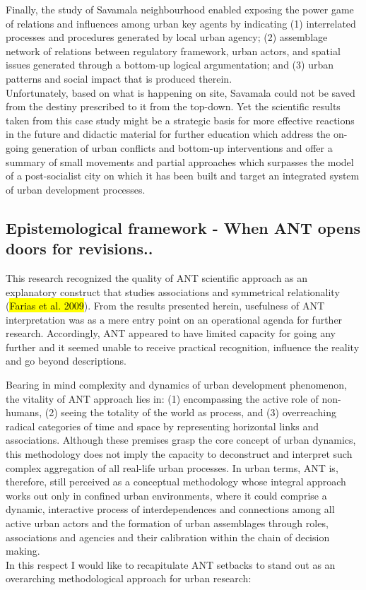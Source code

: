 \documentclass[11pt]{report}
\begin{document}
Finally, the study of Savamala neighbourhood enabled exposing the power game of relations and influences among urban key agents by indicating
(1)	interrelated processes and procedures generated by local urban agency;
(2)	assemblage network of relations between regulatory framework, urban actors,  and spatial issues generated through a bottom-up logical argumentation;
and
(3)	urban  patterns  and  social  impact that is produced therein.  
\\
Unfortunately, based on what is happening on site, Savamala could not be saved from the destiny prescribed to it from the top-down.
Yet the scientific results taken from this case study might be a strategic basis for more effective reactions in the future and didactic material for further education which address the on-going generation of urban conflicts and bottom-up interventions and offer a summary of small movements and partial approaches which surpasses the model of a post-socialist city on which it has been built and target an integrated system of urban development processes.
 
\subsection{Epistemological framework - When ANT opens doors for revisions..}
 
This research recognized the quality of ANT scientific approach as an explanatory construct that studies associations and symmetrical relationality (\hl{Farias et al. 2009}).
From the results presented herein, usefulness of ANT interpretation was as a mere entry point on an operational agenda for further research.
Accordingly, ANT appeared to have limited capacity for going any further and it seemed unable to receive practical recognition, influence the reality and go beyond descriptions.

Bearing in mind complexity and dynamics of urban development phenomenon, the vitality of ANT approach lies in: (1) encompassing the active role of non-humans, (2) seeing the totality of the world as process, and (3) overreaching radical categories of time and space by representing horizontal links and associations.
Although these premises grasp the core concept of urban dynamics, this methodology does not imply the capacity to deconstruct and interpret such complex aggregation of all real-life urban processes.
In urban terms, ANT is, therefore, still perceived as a conceptual methodology whose integral approach works out only in confined urban environments, where it could comprise a dynamic, interactive process of interdependences and connections among all active urban actors and the formation of urban assemblages through roles, associations and agencies and their calibration within the chain of decision making.
\\
In this respect I would like to recapitulate ANT setbacks to stand out as an overarching methodological approach for urban research:
\end{document}
